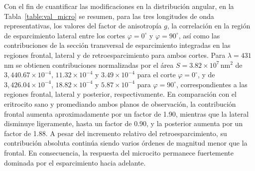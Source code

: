 Con el fin de cuantificar las modificaciones en la distribución angular, en la Tabla~\ref{table:val_micro} se resumen, para las tres longitudes de onda representativas, los valores del factor de anisotropía $g$, la correlación en la región de esparcimiento lateral entre los cortes $\varphi=0^\circ$ y $\varphi=90^\circ$, así como las contribuciones de la sección transversal de esparcimiento integradas en las regiones frontal, lateral y de retroesparcimiento para ambos cortes.  Para $\lambda=431$ nm se obtienen contribuciones normalizadas por el área $S=3.82\times 10^{7}\,\text{nm}^2$  de $3,440.67\times 10^{-4}$, $11.32\times 10^{-4}$ y $3.49\times 10^{-4}$ para el corte $\varphi=0^{\circ}$, y de $3,426.04\times 10^{-4}$, $18.82\times 10^{-4}$ y $5.87\times 10^{-4}$ para $\varphi=90^{\circ}$, correspondientes a las regiones frontal, lateral y posterior, respectivamente. En comparación con el eritrocito sano y promediando ambos planos de observación, la contribución frontal aumenta aproximadamente por un factor de 1.90, mientras que la lateral disminuye ligeramente, hasta un factor de 0.90, y la posterior aumenta por un factor de 1.88. A pesar del incremento relativo del retroesparcimiento, su contribución absoluta continúa siendo varios órdenes de magnitud menor que la frontal. En consecuencia, la respuesta del microcito permanece fuertemente dominada por el esparcimiento hacia adelante.
%
